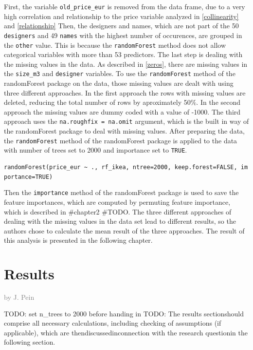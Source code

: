 \documentclass[a4paper, nobind]{templates/ociamthesis}
\begin{document}
First, the variable \texttt{old\_price\_eur} is removed from the data frame, due to a very high correlation and relationship to the price variable analyzed in \ref{collinearity} and \ref{relationship} Then, the designers and names, which are not part of the 50 \texttt{designers} and 49 \texttt{names} with the highest number of occurences, are grouped in the \texttt{other} value. This is because the \texttt{randomForest} method does not allow categorical variables with more than 53 predictors. The last step is dealing with the missing values in the data. As described in \ref{zeros}, there are missing values in the \texttt{size\_m3} and \texttt{designer} variables. To use the \texttt{randomForest} method of the randomForest package on the data, those missing values are dealt with using three different approaches. In the first approach the rows with missing values are deleted, reducing the total number of rows by aproximately 50\%. In the second approach the missing values are dummy coded with a value of -1000. The third approach uses the \texttt{na.roughfix\ =\ na.omit} argument, which is the built in way of the randomForest package to deal with missing values.
After preparing the data, the \texttt{randomForest} method of the randomForest package is applied to the data with number of trees set to 2000 and importance set to \texttt{TRUE}.

\texttt{randomForest(price\_eur\ \textasciitilde{}\ .,\ rf\_ikea,\ ntree=2000,\ keep.forest=FALSE,\ importance=TRUE)}

Then the \texttt{importance} method of the randomForest package is used to save the feature importances, which are computed by permuting feature importance, which is described in \#chapter2 \#TODO. The three different approaches of dealing with the missing values in the data set lead to different results, so the authors chose to calculate the mean result of the three approaches. The result of this analysis is presented in the following chapter.

\hypertarget{results}{%
\chapter{Results}\label{results}}

\hfill\textcolor{gray}{by J. Pein}

TODO: set n\_trees to 2000 before handing in
TODO: The results sectionshould comprise all necessary calculations, including checking of assumptions (if applicable), which are thendiscussedinconnection with the research questionin the following section.
\end{document}
